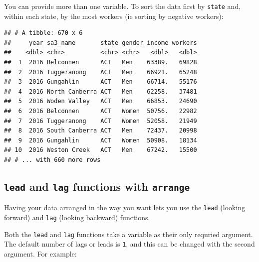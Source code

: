 \documentclass[]{book}
\newenvironment{Shaded}{\begin{snugshade}}{\end{snugshade}}
\newcommand{\DataTypeTok}[1]{\textcolor[rgb]{0.13,0.29,0.53}{#1}}
\newcommand{\DecValTok}[1]{\textcolor[rgb]{0.00,0.00,0.81}{#1}}
\newcommand{\KeywordTok}[1]{\textcolor[rgb]{0.13,0.29,0.53}{\textbf{#1}}}
\newcommand{\NormalTok}[1]{#1}
\newcommand{\OperatorTok}[1]{\textcolor[rgb]{0.81,0.36,0.00}{\textbf{#1}}}
\newcommand{\StringTok}[1]{\textcolor[rgb]{0.31,0.60,0.02}{#1}}
\begin{document}
You can provide more than one variable. To sort the data first by \texttt{state} and, within each state, by the most workers (ie sorting by negative workers):

\begin{Shaded}
\end{Shaded}

\begin{verbatim}
## # A tibble: 670 x 6
##     year sa3_name       state gender income workers
##    <dbl> <chr>          <chr> <chr>   <dbl>   <dbl>
##  1  2016 Belconnen      ACT   Men    63389.   69828
##  2  2016 Tuggeranong    ACT   Men    66921.   65248
##  3  2016 Gungahlin      ACT   Men    66714.   55176
##  4  2016 North Canberra ACT   Men    62258.   37481
##  5  2016 Woden Valley   ACT   Men    66853.   24690
##  6  2016 Belconnen      ACT   Women  50756.   22982
##  7  2016 Tuggeranong    ACT   Women  52058.   21949
##  8  2016 South Canberra ACT   Men    72437.   20998
##  9  2016 Gungahlin      ACT   Women  50908.   18134
## 10  2016 Weston Creek   ACT   Men    67242.   15500
## # ... with 660 more rows
\end{verbatim}

\hypertarget{lead-and-lag-functions-with-arrange}{%
\subsection{\texorpdfstring{\texttt{lead} and \texttt{lag} functions with \texttt{arrange}}{lead and lag functions with arrange}}\label{lead-and-lag-functions-with-arrange}}

Having your data arranged in the way you want lets you use the \texttt{lead} (looking forward) and \texttt{lag} (looking backward) functions.

Both the \texttt{lead} and \texttt{lag} functions take a variable as their only requried argument. The default number of lags or leads is \texttt{1}, and this can be changed with the second argument. For example:

\begin{Shaded}
\end{Shaded}
\end{document}
